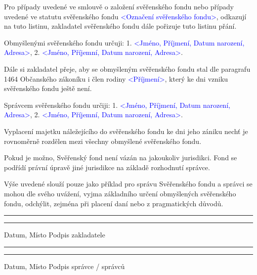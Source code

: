 \documentclass[parskip=half]{scrreprt}
\begin{document}
\begin{contract}



Pro případy uvedené ve smlouvě o založení svěřenského fondu nebo případy uvedené ve statutu svěřenského fondu \textcolor{blue}{<Označení svěřenského fondu>}, odkazují na tuto listinu, zakladatel svěřenského fondu dále pořizuje tuto listinu přání.


Obmyšlenými svěřenského fondu určuji:
1. \textcolor{blue}{<Jméno, Příjmení, Datum narození, Adresa>},
2. \textcolor{blue}{<Jméno, Příjemní, Datum narození, Adresa>}.

Dále si zakladatel přeje, aby se obmyšleným svěřenského fondu stal dle paragrafu 1464 Občanského zákoníku i člen rodiny \textcolor{blue}{<Příjmení>}, který ke dni vzniku svěřenského fondu ještě není.


Správcem svěřenského fondu určiji:
1. \textcolor{blue}{<Jméno, Příjmení, Datum narození, Adresa>},
2. \textcolor{blue}{<Jméno, Příjemní, Datum narození, Adresa>}.


Vyplacení majetku náležejícího do svěřenského fondu ke dni jeho zániku nechť je rovnoměrně rozdělen mezi všechny obmyšlené svěřenského fondu.



Pokud je možno, Svěřenský fond není vázán na jakoukoliv jurisdikci. Fond se podřídí právní úpravě jiné jurisdikce na základě rozhodnutí správce.

Výše uvedené slouží pouze jako příklad pro správu Svěřenského fondu a správci se mohou dle svého uvážení, vyjma základního určení obmyšlených svěřenského fondu, odchýlit, zejména při placení daní nebo z pragmatických důvodů.
	
\end{contract}
\newpage

\vspace{50pt} 
\noindent\rule{7cm}{.4pt}\hfill\rule{7cm}{.4pt}\par 
\noindent Datum, Místo \hfill Podpis zakladatele

\vspace{50pt} 
\noindent\rule{7cm}{.4pt}\hfill\rule{7cm}{.4pt}\par 
\noindent Datum, Místo \hfill Podpis správce / správců
\end{document}

